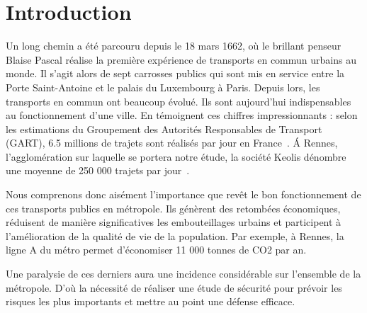 \section{Introduction}

Un long chemin a été parcouru depuis le 18 mars 1662, où le brillant penseur Blaise Pascal réalise la première expérience de transports en commun urbains au monde. Il s'agit alors de sept carrosses publics qui sont mis en service entre la Porte Saint-Antoine et le palais du Luxembourg à Paris. Depuis lors, les transports en commun ont beaucoup évolué. Ils sont aujourd'hui indispensables au fonctionnement d'une ville. En témoignent ces chiffres impressionnants : selon les estimations du Groupement des Autorités Responsables de Transport (GART), 6.5 millions de trajets sont réalisés par jour en France~\cite{Gart}. \'A Rennes, l'agglomération sur laquelle se portera notre étude, la société Keolis dénombre une moyenne de 250 000 trajets par jour~\cite{Keolis}. 

Nous comprenons donc aisément l'importance que revêt le bon fonctionnement de ces transports publics en métropole. Ils génèrent des retombées économiques, réduisent de manière significatives les embouteillages urbains et participent à l’amélioration de la qualité de vie de la population. Par exemple, à Rennes, la ligne A du métro permet d'économiser 11 000 tonnes de CO2 par an. \cite{bilanLA}

Une paralysie de ces derniers aura une incidence considérable sur l'ensemble de la métropole. D’où la nécessité de réaliser une étude de sécurité pour prévoir les risques les plus importants et mettre au point une défense efficace. 

























